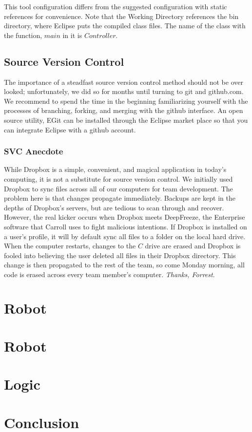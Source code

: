 \documentclass[12pt]{article}
\begin{document}
This tool configuration differs from the suggested configuration with static references for convenience.  Note that the Working Directory references the bin directory, where Eclipse puts the compiled class files.  The name of the class with the function, $main$ in it is $Controller$.

\subsection{Source Version Control}
The importance of a steadfast source version control method should not be over looked; unfortunately, we did so for months until turning to git and github.com.  We recommend to spend the time in the beginning familiarizing yourself with the processes of branching, forking, and merging with the github interface.  An open source utility, EGit can be installed through the Eclipse market place so that you can integrate Eclipse with a github account.

\subsubsection*{SVC Anecdote}
While Dropbox is a simple, convenient, and magical application in today's computing, it is not a substitute for source version control.  We initially used Dropbox to sync files across all of our computers for team development.  The problem here is that changes propagate immediately.  Backups are kept in the depths of Dropbox's servers, but are tedious to scan through and recover.  However, the real kicker occurs when Dropbox meets DeepFreeze, the Enterprise software that Carroll uses to fight malicious intentions.  If Dropbox is installed on a user's profile, it will by default sync all files to a folder on the local hard drive.  When the computer restarts, changes to the $C$ drive are erased and Dropbox is fooled into believing the user deleted all files in their Dropbox directory.  This change is then propagated to the rest of the team, so come Monday morning, all code is erased across every team member's computer.  \textit{Thanks, Forrest}.

\clearpage
\section{Robot}

\section{Robot}

\section{Logic}

\section{Conclusion}
\end{document}
